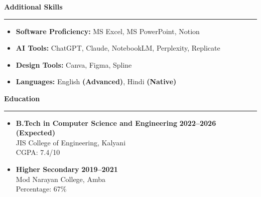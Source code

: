 \documentclass[11pt,a4paper]{article}
\newcommand{\sectionheading}[1]{%
    \vspace{0.5em}%
    {\large\headingfont\color{primary}\textbf{#1}}%
    \vspace{0.25em}%
    \hrule%
    \vspace{0.5em}%
}
\newenvironment{cvitemize}{%
    \begin{itemize}[leftmargin=1.5em, nosep, noitemsep]
}{%
    \end{itemize}
}
\begin{document}
\sectionheading{Additional Skills}
\begin{cvitemize}
    \item \textbf{Software Proficiency:} MS Excel, MS PowerPoint, Notion
    \item \textbf{AI Tools:} ChatGPT, Claude, NotebookLM, Perplexity, Replicate
    \item \textbf{Design Tools:} Canva, Figma, Spline
     \item \textbf{Languages:} English \textbf{(Advanced)}, Hindi \textbf{(Native)}
\end{cvitemize}

\sectionheading{Education}
\begin{cvitemize}
    \item \textbf{B.Tech in Computer Science and Engineering} \hfill \textbf{2022--2026 (Expected)} \\
    JIS College of Engineering, Kalyani \\
    CGPA: 7.4/10

    \item \textbf{Higher Secondary} \hfill \textbf{2019--2021} \\
    Mod Narayan College, Amba \\
    Percentage: 67\%
\end{cvitemize}
\end{document}
